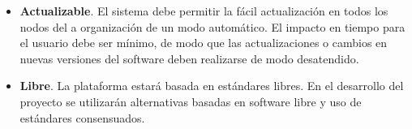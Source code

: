 \begin{itemize}
    \item{\textbf{Actualizable}. El sistema debe permitir la fácil 
    actualización en todos los nodos del a organización de un modo 
    automático. El impacto en tiempo para el usuario debe ser mínimo, de modo 
    que las actualizaciones o cambios en nuevas versiones del software deben
    realizarse de modo desatendido.}

    \item{\textbf{Libre}. La plataforma estará basada en estándares libres. En 
    el desarrollo del proyecto se utilizarán alternativas basadas en software 
    libre y uso de estándares consensuados.}
\end{itemize}


